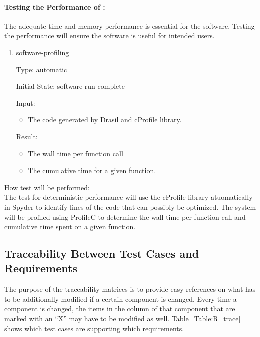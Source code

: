 \documentclass[12pt, titlepage]{article}
\begin{document}
\paragraph{Testing the Performance of \progname{}:}

The adequate time and memory performance is essential for the \progname{} 
software. Testing the performance will ensure the software is useful for 
intended users. 

\begin{enumerate}

\item{software-profiling\\}

Type: automatic
					
Initial State: \progname{} software run complete
					
Input:
\begin{itemize} %
\item The code generated by Drasil and cProfile library.
\end{itemize}

Result: 
\begin{itemize}
\item The wall time per function call
\item The cumulative time for a given function.
\end{itemize}

\end{enumerate}
				
					
How test will be performed: \\
The test for deterministic performance will use the cProfile library 
atuomatically in Spyder to identify lines of the code that can possibly be 
optimized. The system will be profiled using ProfileC to determine the wall time 
per function call and cumulative time spent on a given function.\\


\subsection{Traceability Between Test Cases and Requirements}

The purpose of the traceability matrices is to provide easy references on what
has to be additionally modified if a certain component is changed.  Every time a
component is changed, the items in the column of that component that are marked
with an ``X'' may have to be modified as well.  Table~\ref{Table:R_trace} shows 
which test cases are supporting which requirements.
\end{document}
